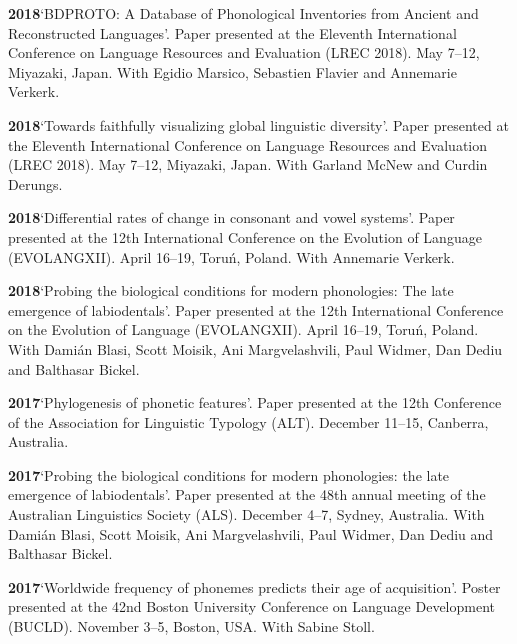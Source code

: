 \documentclass[11pt]{article}
\newcommand{\hangpara}{
 \setlength{\parindent}{0in} %
 \hangindent=0.42in %
}
\begin{document}
\vskip 6pt
\hangpara
{\bf 2018}\hspace{1ex}`BDPROTO: A Database of Phonological Inventories from Ancient and Reconstructed Languages'. Paper presented at the Eleventh International Conference on Language Resources and Evaluation (LREC 2018). May 7--12, Miyazaki, Japan. With Egidio Marsico, Sebastien Flavier and Annemarie Verkerk.

\vskip 6pt
\hangpara
{\bf 2018}\hspace{1ex}`Towards faithfully visualizing global linguistic diversity'. Paper presented at the Eleventh International Conference on Language Resources and Evaluation (LREC 2018). May 7--12, Miyazaki, Japan. With Garland McNew and Curdin Derungs.

\vskip 6pt
\hangpara
{\bf 2018}\hspace{1ex}`Differential rates of change in consonant and vowel systems'. Paper presented at the 12th International Conference on the Evolution of Language (EVOLANGXII). April 16--19, Toru{\'n}, Poland. With Annemarie Verkerk. %

\vskip 6pt
\hangpara
{\bf 2018}\hspace{1ex}`Probing the biological conditions for modern phonologies: The late emergence of labiodentals'. Paper presented at the 12th International Conference on the Evolution of Language (EVOLANGXII). April 16--19, Toru{\'n}, Poland. With Dami{\'a}n Blasi, Scott Moisik, Ani Margvelashvili, Paul Widmer, Dan Dediu and Balthasar Bickel.

\vskip 6pt
\hangpara
{\bf 2017}\hspace{1ex}`Phylogenesis of phonetic features'. Paper presented at the 12th Conference of the Association for Linguistic Typology (ALT). December 11--15, Canberra, Australia.

\vskip 6pt
\hangpara
{\bf 2017}\hspace{1ex}`Probing the biological conditions for modern phonologies: the late emergence of labiodentals'. Paper presented at the 48th annual meeting of the Australian Linguistics Society (ALS). December 4--7, Sydney, Australia. With Dami{\'a}n Blasi, Scott Moisik, Ani Margvelashvili, Paul Widmer, Dan Dediu and Balthasar Bickel.

\vskip 6pt
\hangpara
{\bf 2017}\hspace{1ex}`Worldwide frequency of phonemes predicts their age of acquisition'. Poster presented at the 42nd Boston University Conference on Language Development (BUCLD). November 3--5, Boston, USA. With Sabine Stoll.
\end{document}
